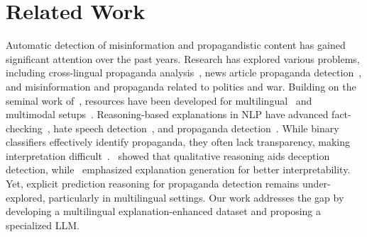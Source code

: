 \section{Related Work}
\label{sec:related_work}


Automatic detection of misinformation and propagandistic content has gained significant attention over the past years. Research has explored various problems, including cross-lingual propaganda analysis~\cite{barron2019proppy}, news article propaganda detection~\cite{da-san-martino-etal-2019-fine}, and misinformation and propaganda related to politics and war. Building on the seminal work of~\citet{da-san-martino-etal-2019-fine}, resources have been developed for multilingual~\cite{piskorski-etal-2023-semeval,hasanain-etal-2023-araieval} and multimodal setups~\cite{SemEval2021-6-Dimitrov,araieval:arabicnlp2024-overview}. 
Reasoning-based explanations in NLP have advanced fact-checking~\cite{russo2023benchmarking}, hate speech detection~\cite{huang-etal-2024-chatgpt}, and propaganda detection~\cite{10.1145/3613904.3642805}. While binary classifiers effectively identify propaganda, they often lack transparency, making interpretation difficult~\cite{atanasova2024generating}.~\citet{RANLP2021:propaganda:interpretable} showed that qualitative reasoning aids deception detection, while~\citet{atanasova2024generating} emphasized explanation generation for better interpretability. Yet, explicit prediction reasoning for propaganda detection remains under-explored, particularly in multilingual settings. Our work addresses the gap by developing a multilingual explanation-enhanced dataset and proposing a specialized LLM.


